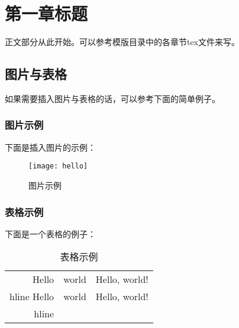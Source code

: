 \documentclass{swfcthesis}
\begin{document}

\makepreliminarypages%
\frontmatter          
\tableofcontents     %
\listoffigures       %
\listoftables        %
\mainmatter

\chapter{第一章标题}


正文部分从此开始。可以参考模版目录中的各章节tex文件来写。

\section{图片与表格}

如果需要插入图片与表格的话，可以参考下面的简单例子。

\subsection{图片示例}

下面是插入图片的示例：

\begin{figure}[!ht]
  \centering
  \texttt{[image: hello]}
  \caption{图片示例}
  \label{fig:hello}
\end{figure}

\subsection{表格示例}

下面是一个表格的例子：

\begin{table}[!ht]
  \centering
  \begin{tabular}{|r|c|l|}
    \hline
    Hello&world&Hello, world!\\hline
    Hello&world&Hello, world!\\hline
  \end{tabular}
  \caption{表格示例}
  \label{tab:hello}
\end{table}
\end{document}
